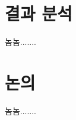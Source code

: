 \documentclass{article}
\begin{document}
\section{ 결과 분석 }

놈놈.......

\section{ 논의 }

놈놈.......



\end{document}

